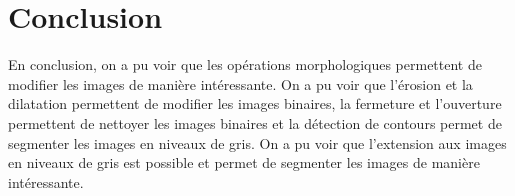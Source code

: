 \documentclass[french,a4paper,10pt]{article}
\begin{document}
	\newpage
	\section{Conclusion}\label{sec:6}

	En conclusion, on a pu voir que les opérations morphologiques permettent de modifier les images de manière
	intéressante.
	On a pu voir que l'érosion et la dilatation permettent de modifier les images binaires, la fermeture et
	l'ouverture permettent de nettoyer les images binaires et la détection de contours permet de segmenter les images
	en niveaux de gris.
	On a pu voir que l'extension aux images en niveaux de gris est possible et permet de segmenter les images de manière
	intéressante.
\end{document}
